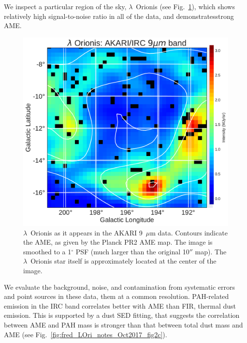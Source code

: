 \documentclass[12pt,a4paper]{article}
\begin{document}
We inspect a particular region of the sky, $\lambda$~Orionis (see Fig.~\ref{fig:orionis-akari9}), which shows relatively high signal-to-noise ratio in all of the data, and demonstratesstrong AME.
  \begin{figure}[h]
    \includegraphics[width=\textwidth/2]{../Plots/LOri_akari9_AMEcont_1dres.pdf}
    \centering
    \caption{\small $\lambda$~Orionis as it appears in the AKARI 9~$\mu$m data. 
    Contours indicate the AME, as given by the Planck PR2 AME map. 
    The image is smoothed to a 1$^{\circ}$ PSF (much larger than the original 10$''$ map).
    The $\lambda$~Orionis star itself is approximately located at the center of the image.}
    \label{fig:orionis-akari9}
  \end{figure}
We evaluate the background, noise, and contamination from systematic errors and point sources in these data, them at a common resolution. 
PAH-related emission in the IRC band correlates better with AME than FIR, thermal dust emission. 
This is supported by a dust SED fitting, that suggests the correlation between AME and PAH mass is stronger than that between total dust mass and AME (see Fig.~\ref{fig:fred_LOri_notes_Oct2017_fig2c}).
\end{document}
